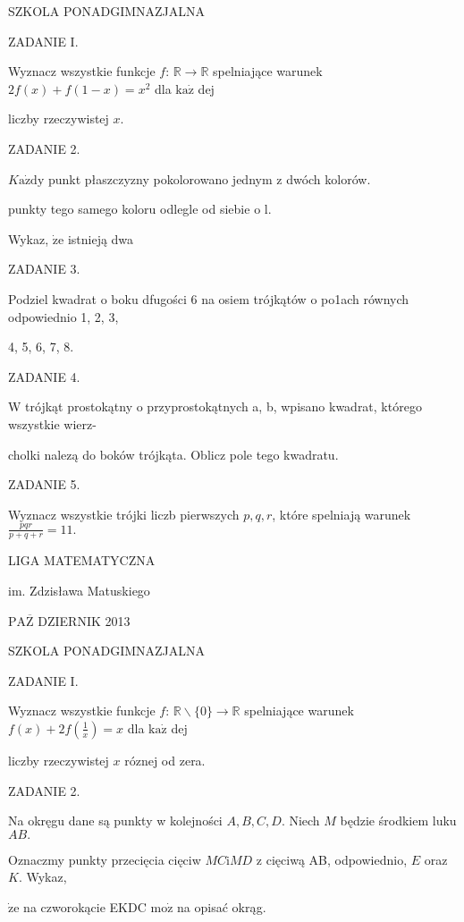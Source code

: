 \documentclass[a4paper,12pt]{article}
\begin{document}
SZKOLA PONADGIMNAZJALNA

ZADANIE I.

Wyznacz wszystkie funkcje $f$: $\mathbb{R}\rightarrow \mathbb{R}$ spelniające warunek $2f(x)+f(1-x) =x^{2}$ dla $\mathrm{k}\mathrm{a}\dot{\mathrm{z}}$ dej

liczby rzeczywistej $x.$

ZADANIE 2.

$K\mathrm{a}\dot{\mathrm{z}}\mathrm{d}\mathrm{y}$ punkt płaszczyzny pokolorowano jednym z dwóch kolorów.

punkty tego samego koloru odlegle od siebie o l.

Wykaz, $\dot{\mathrm{z}}\mathrm{e}$ istnieją dwa

ZADANIE 3.

Podziel kwadrat o boku dfugości 6 na osiem trójkątów o po1ach równych odpowiednio 1, 2, 3,

4, 5, 6, 7, 8.

ZADANIE 4.

W trójkąt prostokątny o przyprostokątnych a, b, wpisano kwadrat, którego wszystkie wierz-

cholki nalezą do boków trójkąta. Oblicz pole tego kwadratu.

ZADANIE 5.

Wyznacz wszystkie trójki liczb pierwszych $p, q, r$, które spelniają warunek $\displaystyle \frac{pqr}{p+q+r}=11.$






LIGA MATEMATYCZNA

im. Zdzisława Matuskiego

$\mathrm{P}\mathrm{A}\overline{\mathrm{Z}}$ DZIERNIK 2013

SZKOLA PONADGIMNAZJALNA

ZADANIE I.

Wyznacz wszystkie funkcje $f$: $\mathbb{R}\backslash \{0\}\rightarrow \mathbb{R}$ spelniające warunek $f(x)+2f(\displaystyle \frac{1}{x})=x$ dla $\mathrm{k}\mathrm{a}\dot{\mathrm{z}}$ dej

liczby rzeczywistej $x$ róznej od zera.

ZADANIE 2.

Na okręgu dane są punkty w kolejności $A, B, C, D$. Niech $M$ będzie środkiem luku $AB.$

Oznaczmy punkty przecięcia cięciw $MC\mathrm{i}MD$ z cięciwą AB, odpowiednio, $E$ oraz $K$. Wykaz,

$\dot{\mathrm{z}}\mathrm{e}$ na czworokącie EKDC $\mathrm{m}\mathrm{o}\dot{\mathrm{z}}$ na opisać okrąg.
\end{document}
